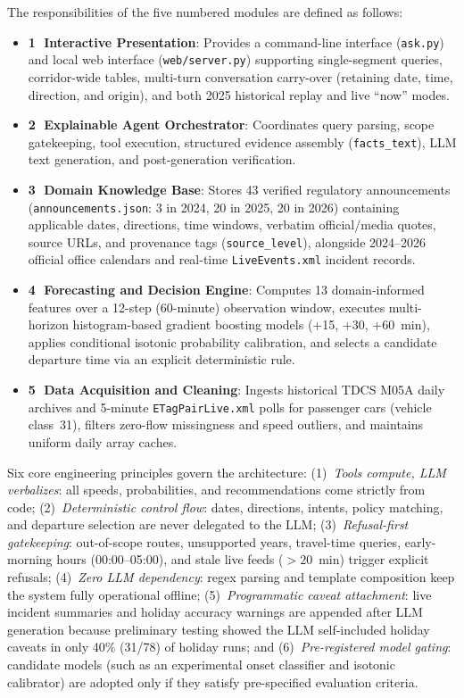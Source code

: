 \documentclass[conference]{IEEEtran}
\begin{document}
The responsibilities of the five numbered modules are defined as follows:
\begin{itemize}
    \item \textbf{\textcircled{1} Interactive Presentation}: Provides a command-line interface (\texttt{ask.py}) and local web interface (\texttt{web/server.py}) supporting single-segment queries, corridor-wide tables, multi-turn conversation carry-over (retaining date, time, direction, and origin), and both 2025 historical replay and live ``now'' modes.
    \item \textbf{\textcircled{2} Explainable Agent Orchestrator}: Coordinates query parsing, scope gatekeeping, tool execution, structured evidence assembly (\texttt{facts\_text}), LLM text generation, and post-generation verification.
    \item \textbf{\textcircled{3} Domain Knowledge Base}: Stores 43 verified regulatory announcements (\texttt{announcements.json}: 3 in 2024, 20 in 2025, 20 in 2026) containing applicable dates, directions, time windows, verbatim official/media quotes, source URLs, and provenance tags (\texttt{source\_level}), alongside 2024--2026 official office calendars and real-time \texttt{LiveEvents.xml} incident records.
    \item \textbf{\textcircled{4} Forecasting and Decision Engine}: Computes 13 domain-informed features over a 12-step (60-minute) observation window, executes multi-horizon histogram-based gradient boosting models (+15, +30, +60~min), applies conditional isotonic probability calibration, and selects a candidate departure time via an explicit deterministic rule.
    \item \textbf{\textcircled{5} Data Acquisition and Cleaning}: Ingests historical TDCS M05A daily archives and 5-minute \texttt{ETagPairLive.xml} polls for passenger cars (vehicle class~31), filters zero-flow missingness and speed outliers, and maintains uniform daily array caches.
\end{itemize}

Six core engineering principles govern the architecture: (1)~\emph{Tools compute, LLM verbalizes}: all speeds, probabilities, and recommendations come strictly from code; (2)~\emph{Deterministic control flow}: dates, directions, intents, policy matching, and departure selection are never delegated to the LLM; (3)~\emph{Refusal-first gatekeeping}: out-of-scope routes, unsupported years, travel-time queries, early-morning hours (00:00--05:00), and stale live feeds ($>20$~min) trigger explicit refusals; (4)~\emph{Zero LLM dependency}: regex parsing and template composition keep the system fully operational offline; (5)~\emph{Programmatic caveat attachment}: live incident summaries and holiday accuracy warnings are appended after LLM generation because preliminary testing showed the LLM self-included holiday caveats in only 40\% (31/78) of holiday runs; and (6)~\emph{Pre-registered model gating}: candidate models (such as an experimental onset classifier and isotonic calibrator) are adopted only if they satisfy pre-specified evaluation criteria.
\end{document}
